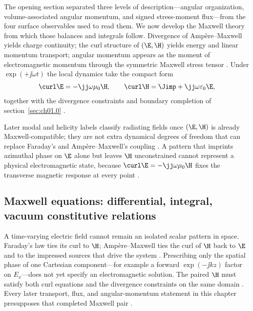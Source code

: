The opening section separated three levels of description---angular organization, volume-associated angular momentum, and signed stress-moment flux---from the four surface observables used to read them. We now develop the Maxwell theory from which those balances and integrals follow. Divergence of Amp\`ere--Maxwell yields charge continuity; the curl structure of $(\E,\H)$ yields energy and linear momentum transport; angular momentum appears as the moment of electromagnetic momentum through the symmetric Maxwell stress tensor \cite{maxwell1873,poynting1884,beth1936}. Under $\exp(+\jj\omega t)$ the local dynamics take the compact form
\begin{equation}
\label{eq:ch1.maxwell-centre}
\curl \E=-\jj\omega\mu_0\H,\qquad
\curl \H=\Jimp+\jj\omega\varepsilon_0\E,
\end{equation}
together with the divergence constraints and boundary completion of section~\ref{sec:ch01.0} \cite{stratton1941}.

Later modal and helicity labels classify radiating fields once $(\E,\H)$ is already Maxwell-compatible; they are not extra dynamical degrees of freedom that can replace Faraday's and Amp\`ere--Maxwell's coupling \cite{maxwell1873,jackson1999}. A pattern that imprints azimuthal phase on $\E$ alone but leaves $\H$ unconstrained cannot represent a physical electromagnetic state, because $\curl\E=-\jj\omega\mu_0\H$ fixes the transverse magnetic response at every point \cite{stratton1941}.

\subsection{Maxwell equations: differential, integral, vacuum constitutive relations}
\label{sec:ch01.1.1}

A time-varying electric field cannot remain an isolated scalar pattern in space. Faraday's law ties its curl to $\H$; Amp\`ere--Maxwell ties the curl of $\H$ back to $\E$ and to the impressed sources that drive the system \cite{maxwell1873,stratton1941}. Prescribing only the spatial phase of one Cartesian component---for example a forward $\exp(-\jj k z)$ factor on $E_x$---does not yet specify an electromagnetic solution. The paired $\H$ must satisfy both curl equations and the divergence constraints on the same domain \cite{stratton1941,jackson1999}. Every later transport, flux, and angular-momentum statement in this chapter presupposes that completed Maxwell pair \cite{stratton1941}.

